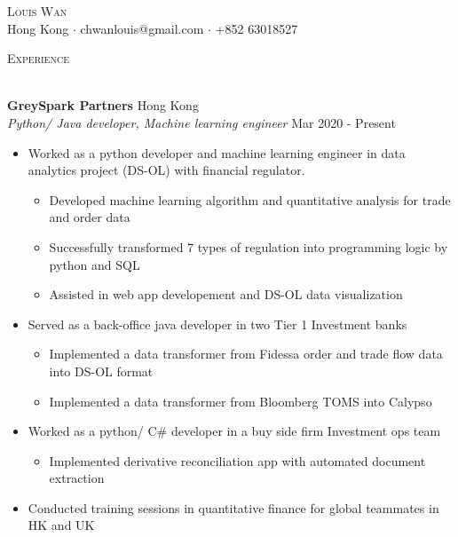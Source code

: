 \documentclass[a4paper]{article}
\newcommand{\lineunder} {
    \vspace*{-8pt} \\
    \hspace*{-18pt} \hrulefill \\
}
\newcommand{\header} [1] {
    {\hspace*{-18pt}\vspace*{6pt} \textsc{#1}}
    \vspace*{-6pt} \lineunder
}
\begin{document}
\vspace*{-40pt}

    

\vspace*{-10pt}
\begin{center}
	{\Huge \scshape {Louis Wan}}\\
	Hong Kong $\cdot$ chwanlouis@gmail.com $\cdot$ +852 63018527\\
\end{center}

\header{Experience}
\vspace{1mm}

\textbf{GreySpark Partners} \hfill Hong Kong\\
\textit{Python/ Java developer, Machine learning engineer} \hfill Mar 2020 - Present\\
\vspace{-1mm}
\begin{itemize} \itemsep 1pt
	\item Worked as a python developer and machine learning engineer in data analytics project (DS-OL) with financial regulator.
        \begin{itemize}
            \item Developed machine learning algorithm and quantitative analysis for trade and order data
            \item Successfully transformed 7 types of regulation into programming logic by python and SQL
            \item Assisted in web app developement and DS-OL data visualization
        \end{itemize}
	\item Served as a back-office java developer in two Tier 1 Investment banks
        \begin{itemize}
            \item Implemented a data transformer from Fidessa order and trade flow data into DS-OL format
            \item Implemented a data transformer from Bloomberg TOMS into Calypso
        \end{itemize}
	\item Worked as a python/ C\# developer in a buy side firm Investment ops team
        \begin{itemize}
            \item Implemented derivative reconciliation app with automated document extraction
        \end{itemize}
	\item Conducted training sessions in quantitative finance for global teammates in HK and UK
\end{itemize}
\end{document}
